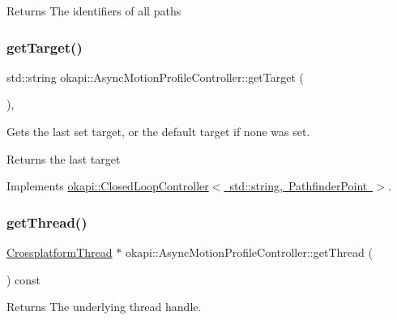 \begin{DoxyReturn}{Returns}
The identifiers of all paths 
\end{DoxyReturn}
\mbox{\label{classokapi_1_1AsyncMotionProfileController_a9f9e44e987481619cbec37d5e35c71e8}} 
\subsubsection{\texorpdfstring{getTarget()}{getTarget()}}
{\footnotesize\ttfamily std\+::string okapi\+::\+Async\+Motion\+Profile\+Controller\+::get\+Target (\begin{DoxyParamCaption}{ }\end{DoxyParamCaption})\hspace{0.3cm}{\ttfamily [override]}, {\ttfamily [virtual]}}

Gets the last set target, or the default target if none was set.

\begin{DoxyReturn}{Returns}
the last target 
\end{DoxyReturn}


Implements \mbox{\hyperlink{classokapi_1_1ClosedLoopController_a22012bedbfaff6e5a3a508f274ec2497}{okapi\+::\+Closed\+Loop\+Controller$<$ std\+::string, Pathfinder\+Point $>$}}.

\mbox{\label{classokapi_1_1AsyncMotionProfileController_aaac5113b3567c28dc1c5ba0dcf7facdd}} 
\subsubsection{\texorpdfstring{getThread()}{getThread()}}
{\footnotesize\ttfamily \mbox{\hyperlink{classCrossplatformThread}{Crossplatform\+Thread}} $\ast$ okapi\+::\+Async\+Motion\+Profile\+Controller\+::get\+Thread (\begin{DoxyParamCaption}{ }\end{DoxyParamCaption}) const}

\begin{DoxyReturn}{Returns}
The underlying thread handle. 
\end{DoxyReturn}
\mbox{\label{classokapi_1_1AsyncMotionProfileController_adc93d9516b749dee19f0af735d4b83cb}} 

